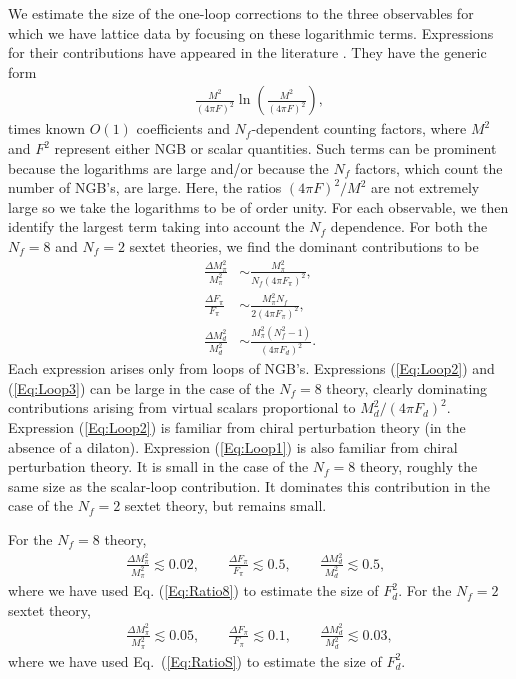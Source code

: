 \documentclass[a4paper,11pt]{article}
\begin{document}
We estimate the size of the one-loop corrections to the three observables for which we have lattice data by focusing on these logarithmic terms. Expressions for their contributions have appeared in the literature \cite{EFTDilaton3,EFTDilaton4,Bijnens:2009qm}. They have the generic form
\begin{align}
\frac{M^2}{(4\pi F)^2} \ln \left(\frac{M^2}{(4\pi F)^2}\right), \nonumber
\end{align}
 times known $O(1)$ coefficients and $N_f$-dependent counting factors, where $M^2$ and $F^2$ represent either NGB or scalar quantities. Such terms can be prominent because the logarithms are large and/or because the $N_f$ factors, which count the number of NGB's, are large. Here, the ratios $(4 \pi F)^2/M^2$ are not extremely large so we take the logarithms to be of order unity. For each observable, we then identify the largest term taking into account the $N_f$ dependence. For both the $N_f=8$ and $N_f=2$ sextet theories, we find the dominant contributions to be
\begin{align}
\frac{\Delta M^2_\pi}{M^2_\pi} & \sim  \frac{M^2_\pi}{N_f(4\pi F_\pi)^2},\label{Eq:Loop1}\\
\frac{\Delta F_\pi}{F_\pi} & \sim \frac{M^2_\pi N_f}{2(4\pi F_\pi)^2},\label{Eq:Loop2}\\
\frac{\Delta M^2_d}{M^2_d} & \sim \frac{M^2_\pi (N^2_f-1)}{(4\pi F_d)^2}.\label{Eq:Loop3}
\end{align}
Each expression arises only from loops of NGB's. Expressions (\ref{Eq:Loop2}) and (\ref{Eq:Loop3}) can be large in the case of the $N_f = 8$ theory, clearly dominating contributions arising from virtual scalars proportional to $M_d^2/(4 \pi F_d)^2$. Expression (\ref{Eq:Loop2}) is familiar from chiral perturbation theory (in the absence of a dilaton).  Expression (\ref{Eq:Loop1}) is also familiar from chiral perturbation theory. It is small in the case of the $N_f = 8$ theory, roughly the same size as the scalar-loop contribution. It dominates this contribution in the case of the $N_f=2$ sextet theory, but remains small.

For the $N_f=8$ theory,
\begin{align}
\frac{\Delta M^2_\pi}{M^2_\pi} \lesssim 0.02,\qquad
\frac{\Delta F_\pi}{F_\pi} \lesssim 0.5,\qquad
\frac{\Delta M^2_d}{M^2_d} \lesssim 0.5,\;\;
\end{align}
where we have used Eq. (\ref{Eq:Ratio8}) to estimate the size of $F_d^2$. For the $N_f=2$ sextet theory,
\begin{align}
\frac{\Delta M^2_\pi}{M^2_\pi} \lesssim 0.05,\qquad
\frac{\Delta F_\pi}{F_\pi} \lesssim 0.1,\qquad
\frac{\Delta M^2_d}{M^2_d} \lesssim 0.03,
\end{align}
where we have used Eq.~(\ref{Eq:RatioS}) to estimate the size of $F^2_d$.
\end{document}
